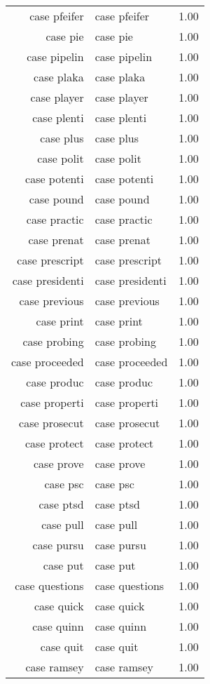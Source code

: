 \begin{table}[ht]
\begin{tabular}{rlr}
  case pfeifer & case pfeifer & 1.00 \\ 
  case pie & case pie & 1.00 \\ 
  case pipelin & case pipelin & 1.00 \\ 
  case plaka & case plaka & 1.00 \\ 
  case player & case player & 1.00 \\ 
  case plenti & case plenti & 1.00 \\ 
  case plus & case plus & 1.00 \\ 
  case polit & case polit & 1.00 \\ 
  case potenti & case potenti & 1.00 \\ 
  case pound & case pound & 1.00 \\ 
  case practic & case practic & 1.00 \\ 
  case prenat & case prenat & 1.00 \\ 
  case prescript & case prescript & 1.00 \\ 
  case presidenti & case presidenti & 1.00 \\ 
  case previous & case previous & 1.00 \\ 
  case print & case print & 1.00 \\ 
  case probing & case probing & 1.00 \\ 
  case proceeded & case proceeded & 1.00 \\ 
  case produc & case produc & 1.00 \\ 
  case properti & case properti & 1.00 \\ 
  case prosecut & case prosecut & 1.00 \\ 
  case protect & case protect & 1.00 \\ 
  case prove & case prove & 1.00 \\ 
  case psc & case psc & 1.00 \\ 
  case ptsd & case ptsd & 1.00 \\ 
  case pull & case pull & 1.00 \\ 
  case pursu & case pursu & 1.00 \\ 
  case put & case put & 1.00 \\ 
  case questions & case questions & 1.00 \\ 
  case quick & case quick & 1.00 \\ 
  case quinn & case quinn & 1.00 \\ 
  case quit & case quit & 1.00 \\ 
  case ramsey & case ramsey & 1.00 \\ 

\end{tabular}
\end{table}

